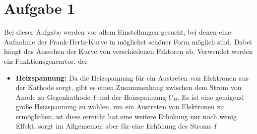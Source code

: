 \section{Aufgabe 1}
Bei dieser Aufgabe werden vor allem Einstellungen gesucht, bei denen eine Aufnahme der Frank-Hertz-Kurve in möglichst schöner Form möglich sind. Dabei hängt das Aussehen der Kurve von verschiedenen Faktoren ab. Verwendet werden ein Funktionsgeneartor, der 
\begin{itemize}
\item[] \textbf{Heizspannung:} Da die Heizspannung für ein Austreten von Elektronen aus der Kathode sorgt, gibt es einen Zusammenhang zwischen dem Strom von Anode zu Gegenkathode \(I\) und der Heizspannung \(U_H\). Es ist eine genügend große Heizspannung zu wählen, um ein Austreten von Elektronen zu ermöglichen, ist diese erreicht hat eine weitere Erhöhung nur noch wenig Effekt, sorgt im Allgemeinen aber für eine Erhöhung des Stroms \(I\)
\end{itemize}